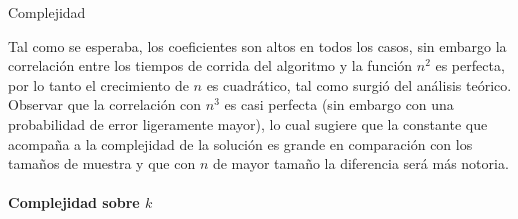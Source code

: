 \begin{subsection}{Complejidad}

Tal como se esperaba, los coeficientes son altos en todos los casos, sin embargo la correlación entre los tiempos de corrida del algoritmo y la función $n^2$ es perfecta, por lo tanto el crecimiento de $n$ es cuadrático, tal como surgió del análisis teórico. Observar que la correlación con $n^3$ es casi perfecta (sin embargo con una probabilidad de error ligeramente mayor), lo cual sugiere que la constante que acompaña a la complejidad de la solución es grande en comparación con los tamaños de muestra y que con $n$ de mayor tamaño la diferencia será más notoria. 

\paragraph{Complejidad sobre $k$}


\end{subsection}
